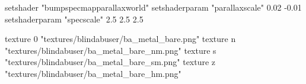 	setshader "bumpspecmapparallaxworld"
		setshaderparam "parallaxscale" 0.02 -0.01
		setshaderparam "specscale" 2.5 2.5 2.5

		texture 0 "textures/blindabuser/ba_metal_bare.png"
		texture n "textures/blindabuser/ba_metal_bare_nm.png"
		texture s "textures/blindabuser/ba_metal_bare_sm.png"
		texture z "textures/blindabuser/ba_metal_bare_hm.png"
